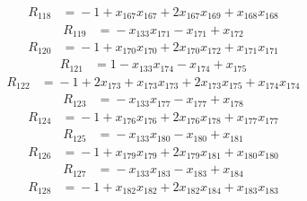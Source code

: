 \begin{align*}
R_{118}&={}-1 +x_{167}x_{167} +2x_{167}x_{169} +x_{168}x_{168}
\end{align*}
\begin{align*}
R_{119}&={}-x_{133}x_{171} -x_{171} +x_{172}
\end{align*}
\begin{align*}
R_{120}&={}-1 +x_{170}x_{170} +2x_{170}x_{172} +x_{171}x_{171}
\end{align*}
\begin{align*}
R_{121}&={}1 -x_{133}x_{174} -x_{174} +x_{175}
\end{align*}
\begin{align*}
R_{122}&={}-1 +2x_{173} +x_{173}x_{173} +2x_{173}x_{175} +x_{174}x_{174}
\end{align*}
\begin{align*}
R_{123}&={}-x_{133}x_{177} -x_{177} +x_{178}
\end{align*}
\begin{align*}
R_{124}&={}-1 +x_{176}x_{176} +2x_{176}x_{178} +x_{177}x_{177}
\end{align*}
\begin{align*}
R_{125}&={}-x_{133}x_{180} -x_{180} +x_{181}
\end{align*}
\begin{align*}
R_{126}&={}-1 +x_{179}x_{179} +2x_{179}x_{181} +x_{180}x_{180}
\end{align*}
\begin{align*}
R_{127}&={}-x_{133}x_{183} -x_{183} +x_{184}
\end{align*}
\begin{align*}
R_{128}&={}-1 +x_{182}x_{182} +2x_{182}x_{184} +x_{183}x_{183}
\end{align*}
